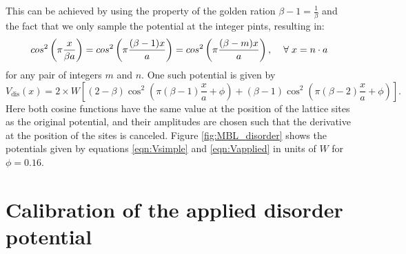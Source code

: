 This can be achieved by using the property of the golden ration $\beta-1 = \frac{1}{\beta}$ and the fact that we only sample the potential at the integer pints, resulting in:
\begin{equation}
cos^2\left(\pi\frac{x}{\beta a}\right) = cos^2\left(\pi\frac{(\beta -1)x}{ a}\right) = cos^2\left(\pi\frac{(\beta - m)x}{ a}\right),\hspace{4mm} \forall \hspace{1mm} x = n\cdot a
\end{equation}
for any pair of integers $m$  and $n$. One such potential is given by
\begin{equation}\label{eqn:Vapplied}
V_\text{dis}(x) =2 \times W\left [(2-\beta)\cos^2 \left(\pi(\beta-1)\frac{x}{a} + \phi \right) + (\beta-1)\cos^2 \left(\pi(\beta-2)\frac{x}{a} + \phi \right)\right ].
\end{equation}
Here both cosine functions have the same value at the position of the lattice sites as the original potential, and their amplitudes are chosen such that the derivative at the position of the sites is canceled. Figure \ref{fig:MBL_disorder} shows the potentials given by equations \ref{eqn:Vsimple} and \ref{eqn:Vapplied} in units of $W$ for $\phi = 0.16$.

\section{Calibration of the applied disorder potential}

